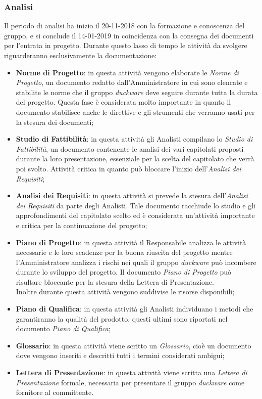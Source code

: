 \subsubsection{Analisi}
Il periodo di analisi ha inizio il 20-11-2018 con la formazione e conoscenza del gruppo, e si conclude il 14-01-2019 in coincidenza con la consegna dei documenti per l'entrata in progetto. Durante questo lasso di tempo le attività da svolgere riguarderanno esclusivamente la documentazione:
	\begin{itemize}
		\item \textbf{Norme di Progetto}: in questa attività vengono elaborate le \emph{Norme di Progetto}, un documento redatto dall'Amministratore in cui sono elencate e stabilite le norme che il gruppo \emph{duckware} deve seguire durante tutta la durata del progetto. Questa fase è considerata molto importante in quanto il documento stabilisce anche le direttive e gli strumenti che verranno usati per la stesura dei documenti;
		\item \textbf{Studio di Fattibilità}: in questa attività gli Analisti compilano lo \emph{Studio di Fattibilità}, un documento contenente le analisi dei vari capitolati proposti durante la loro presentazione, essenziale per la scelta del capitolato che verrà poi svolto. Attività critica in quanto può bloccare l'inizio dell'\emph{Analisi dei Requisiti};
		\item \textbf{Analisi dei Requisiti}: in questa attività si prevede la stesura dell'\emph{Analisi dei Requisiti} da parte degli Analisti. Tale documento racchiude lo studio e gli approfondimenti del capitolato scelto ed è considerata un'attività importante e critica per la continuazione del progetto;
		\item \textbf{Piano di Progetto}: in questa attività il Responsabile analizza le attività necessarie e le loro scadenze per la buona riuscita del progetto mentre l'Amministratore analizza i rischi nei quali il gruppo \emph{duckware} può incombere durante lo sviluppo del progetto. Il documento \emph{Piano di Progetto} può risultare bloccante per la stesura della Lettera di Presentazione. \\Inoltre durante questa attività vengono suddivise le risorse disponibili;
		\item \textbf{Piano di Qualifica}: in questa attività gli Analisti individuano i metodi che garantiranno la qualità del prodotto, questi ultimi sono riportati nel documento \emph{Piano di Qualifica};
		\item \textbf{Glossario}: in questa attività viene scritto un \emph{Glossario}, cioè un documento dove vengono inseriti e descritti tutti i termini considerati ambigui;
		\item \textbf{Lettera di Presentazione}: in questa attività viene scritta una \emph{Lettera di Presentazione} formale, necessaria per presentare il gruppo \emph{duckware} come fornitore al committente.
	\end{itemize}
